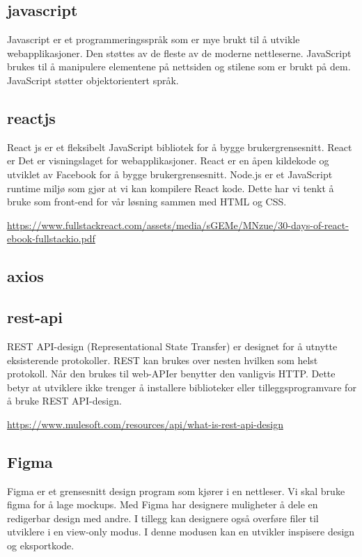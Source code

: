 \subsection{javascript}
Javascript er et programmeringsspråk som er mye brukt til å utvikle webapplikasjoner. Den støttes av de fleste av de moderne nettleserne. JavaScript brukes til å manipulere elementene på nettsiden og stilene som er brukt på dem. JavaScript støtter objektorientert språk.

\subsection{reactjs}
React js er et fleksibelt JavaScript bibliotek for å bygge brukergrensesnitt. React er Det er visningslaget for webapplikasjoner. React er en åpen kildekode og utviklet av Facebook for å bygge brukergrensesnitt. Node.js er et JavaScript runtime miljø som gjør at vi kan kompilere React kode.
Dette har vi tenkt å bruke som front-end for vår løsning sammen med HTML og CSS. 

\url{https://www.fullstackreact.com/assets/media/sGEMe/MNzue/30-days-of-react-ebook-fullstackio.pdf}

\subsection{axios}

\subsection{rest-api}
REST API-design (Representational State Transfer) er designet for å utnytte eksisterende protokoller. REST kan brukes over nesten hvilken som helst protokoll. Når den brukes til web-APIer benytter den vanligvis HTTP. Dette betyr at utviklere ikke trenger å installere biblioteker eller tilleggsprogramvare for å bruke REST API-design.

\url{https://www.mulesoft.com/resources/api/what-is-rest-api-design}

\subsection{Figma}
Figma er et grensesnitt design program som kjører i en nettleser. Vi skal bruke figma for å lage mockups. Med Figma har designere muligheter å dele en redigerbar design med andre. I tillegg kan designere også overføre filer til utviklere i en view-only modus. I denne modusen kan en utvikler inspisere design og eksportkode.

